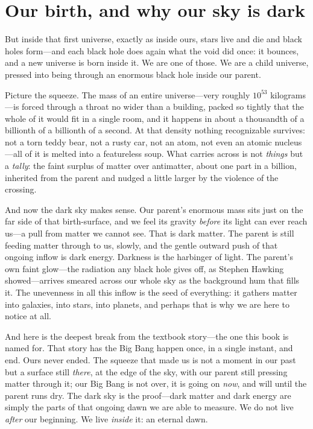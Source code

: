 \section*{Our birth, and why our sky is dark}

But inside that first universe, exactly as inside ours, stars live and die and
black holes form---and each black hole does again what the void did once: it
bounces, and a new universe is born inside it. We are one of those. We are a child
universe, pressed into being through an enormous black hole inside our parent.

Picture the squeeze. The mass of an entire universe---very roughly $10^{53}$
kilograms---is forced through a throat no wider than a building, packed so tightly
that the whole of it would fit in a single room, and it happens in about a
thousandth of a billionth of a billionth of a second. At that density nothing
recognizable survives: not a torn teddy bear, not a rusty car, not an atom, not
even an atomic nucleus---all of it is melted into a featureless soup. What carries
across is not \emph{things} but a \emph{tally}: the faint surplus of matter over
antimatter, about one part in a billion, inherited from the parent and nudged a
little larger by the violence of the crossing.

And now the dark sky makes sense. Our parent's enormous mass sits just on the far
side of that birth-surface, and we feel its gravity \emph{before} its light can
ever reach us---a pull from matter we cannot see. That is dark matter. The parent
is still feeding matter through to us, slowly, and the gentle outward push of that
ongoing inflow is dark energy. Darkness is the harbinger of light. The parent's
own faint glow---the radiation any black hole gives off, as Stephen Hawking
showed---arrives smeared across our whole sky as the background hum that fills it.
The unevenness in all this inflow is the seed of everything: it gathers matter
into galaxies, into stars, into planets, and perhaps that is why we are here to
notice at all.

And here is the deepest break from the textbook story---the one this book is named
for. That story has the Big Bang happen once, in a single instant, and end. Ours
never ended. The squeeze that made us is not a moment in our past but a surface
still \emph{there}, at the edge of the sky, with our parent still pressing matter
through it; our Big Bang is not over, it is going on \emph{now}, and will until the
parent runs dry. The dark sky is the proof---dark matter and dark energy are simply
the parts of that ongoing dawn we are able to measure. We do not live \emph{after}
our beginning. We live \emph{inside} it: an eternal dawn.

